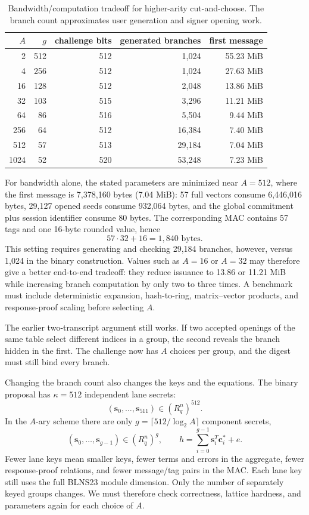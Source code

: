 \documentclass[10pt]{article}
\begin{document}
\begin{table}[htbp]
\centering
\begin{tabular}{rrrrr}
\toprule
$A$ & $g$ & challenge bits & generated branches & first message \\
\midrule
2   & 512 & 512 & 1,024  & 55.23 MiB \\
4   & 256 & 512 & 1,024  & 27.63 MiB \\
16  & 128 & 512 & 2,048  & 13.86 MiB \\
32  & 103 & 515 & 3,296  & 11.21 MiB \\
64  & 86  & 516 & 5,504  & 9.44 MiB \\
256 & 64  & 512 & 16,384 & 7.40 MiB \\
512 & 57  & 513 & 29,184 & 7.04 MiB \\
1024& 52  & 520 & 53,248 & 7.23 MiB \\
\bottomrule
\end{tabular}
\caption{Bandwidth/computation tradeoff for higher-arity cut-and-choose.
The branch count approximates user generation and signer opening work.}
\label{tab:arity}
\end{table}

For bandwidth alone, the stated parameters are minimized near $A=512$, where
the first message is 7,378,160 bytes (7.04 MiB): 57 full vectors consume
6,446,016 bytes, 29,127 opened seeds consume 932,064 bytes, and the global
commitment plus session identifier consume 80 bytes.  The corresponding MAC
contains 57 tags and one 16-byte rounded value, hence
\[
 57\cdot32+16=1{,}840\text{ bytes}.
\]
This setting requires generating and checking 29,184 branches, however, versus
1,024 in the binary construction.  Values such as $A=16$ or $A=32$ may therefore
give a better end-to-end tradeoff: they reduce issuance to 13.86 or 11.21 MiB
while increasing branch computation by only two to three times.  A benchmark
must include deterministic expansion, hash-to-ring, matrix--vector products,
and response-proof scaling before selecting $A$.

The earlier two-transcript argument still works.  If two accepted openings
of the same table select different indices in a group, the second reveals
the branch hidden in the first.  The challenge now has $A$ choices per group,
and the digest must still bind every branch.

Changing the branch count also changes the keys and the equations.  The
binary proposal has $\kappa=512$ independent lane secrets:
\[
 (\mathbf s_0,\ldots,\mathbf s_{511})
     \in (R_q^n)^{512}.
\]
In the $A$-ary scheme there are only $g=\lceil512/\log_2A\rceil$ component
secrets,
\[
 (\mathbf s_0,\ldots,\mathbf s_{g-1})
     \in (R_q^n)^g,
 \qquad
 h=\sum_{i=0}^{g-1}\mathbf s_i^T\mathbf c_i^*+e.
\]
Fewer lane keys mean smaller keys, fewer terms and errors in the aggregate,
fewer response-proof relations, and fewer message/tag pairs in the MAC.
Each lane key still uses the full BLNS23 module dimension.  Only the number
of separately keyed groups changes.  We must therefore check correctness,
lattice hardness, and parameters again for each choice of $A$.
\end{document}
